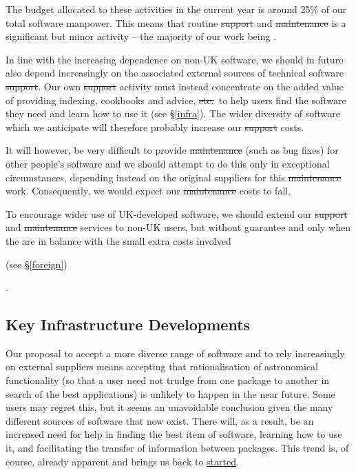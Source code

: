 The budget allocated to these activities in the current year is around
25\% of our total software manpower. This means that routine
\st{support} and \st{maintenance} is a significant but minor activity
-- the majority of our work being \st{}.

In line with the increasing dependence on non-UK software, we should in
future also depend increasingly on the associated external sources of
technical software \st{support}. Our own \st{support} activity must
instead concentrate on the added value of providing indexing,
cookbooks and advice, \st{etc.}\ to help users find the software they
need and learn how to use it (see \S\ref{infra}).  The wider diversity
of software which we anticipate will therefore probably increase our
\st{support} costs.

It will however, be very difficult to provide \st{maintenance} (such
as bug fixes) for other people's software and we should attempt to do
this only in exceptional circumstances, depending instead on the
original suppliers for this \st{maintenance} work. Consequently, we
would expect our \st{maintenance} costs to fall.

\label{international}To encourage wider use of UK-developed software,
we should extend our \st{support} and \st{maintenance} services to
non-UK users, but without guarantee and only when the
 are in balance with the small extra costs
involved\begin{latexonly} (see \S\ref{foreign})\end{latexonly}.

\subsection{\label{infra}Key Infrastructure Developments}

Our proposal to accept a more diverse range of software and to rely
increasingly on external suppliers means accepting that
rationalisation of astronomical functionality (so that a user need not
trudge from one package to another in search of the best applications)
is unlikely to happen in the near future. Some users may regret this,
but it seems an unavoidable conclusion given the many different
sources of software that now exist.  There will, as a result, be an
increased need for help in finding the best item of software, learning
how to use it, and facilitating the transfer of information between
packages. This trend is, of course, already apparent and brings us
back to \hyperref{where we started}{where we started (}{)}{started}.

